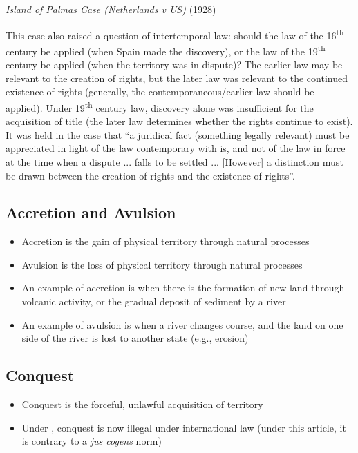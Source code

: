 \begin{casedetails}{\textit{Island of Palmas Case (Netherlands v US)} (1928)}
    \vspace{\baselineskip}

    This case also raised a question of intertemporal law: should the law of the 16\textsuperscript{th} century be applied (when Spain made the discovery), or the law of the 19\textsuperscript{th} century be applied (when the territory was in dispute)? The earlier law may be relevant to the creation of rights, but the later law was relevant to the continued existence of rights (generally, the contemporaneous/earlier law should be applied). Under 19\textsuperscript{th} century law, discovery alone was insufficient for the acquisition of title (the later law determines whether the rights continue to exist). It was held in the case that ``a juridical fact (something legally relevant) must be appreciated in light of the law contemporary with is, and not of the law in force at the time when a dispute ... falls to be settled ... [However] a distinction must be drawn between the creation of rights and the existence of rights''.
\end{casedetails} 

\subsection{Accretion and Avulsion}
\begin{itemize}
    \item Accretion is the gain of physical territory through natural processes
    \item Avulsion is the loss of physical territory through natural processes
    \item An example of accretion is when there is the formation of new land through volcanic activity, or the gradual deposit of sediment by a river
    \item An example of avulsion is when a river changes course, and the land on one side of the river is lost to another state (e.g., erosion)
\end{itemize}

\subsection{Conquest}
\begin{itemize}
    \item Conquest is the forceful, unlawful acquisition of territory
    \item Under , conquest is now illegal under international law (under this article, it is contrary to a \textit{jus cogens} norm)
\end{itemize}

